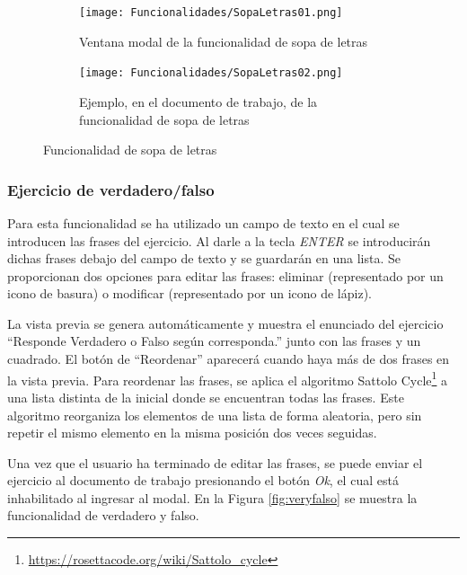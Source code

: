 \begin{figure}[ht!]
  \centering
  \begin{subfigure}{\textwidth}
    \centering
    \texttt{[image: Funcionalidades/SopaLetras01.png]}
    \caption{Ventana modal de la funcionalidad de sopa de letras}
    \label{fig:impsopaletras01}
  \end{subfigure}

  \begin{subfigure}{\textwidth}
    \centering
    \texttt{[image: Funcionalidades/SopaLetras02.png]}
    \caption{Ejemplo, en el documento de trabajo, de la funcionalidad de sopa de letras}
    \label{fig:impsopaletras02}
  \end{subfigure}

  \caption{Funcionalidad de sopa de letras}
  \label{fig:impsopaletras}
\end{figure}

\subsubsection{Ejercicio de verdadero/falso}
\label{sec:funcioVF}
Para esta funcionalidad se ha utilizado un campo de texto en el cual se introducen las frases del ejercicio. Al darle a la tecla \textit{ENTER} se introducirán dichas frases debajo del campo de texto y se guardarán en una lista. Se proporcionan dos opciones para editar las frases: eliminar (representado por un icono de basura) o modificar (representado por un icono de lápiz).

La vista previa se genera automáticamente y muestra el enunciado del ejercicio ``Responde Verdadero o Falso según corresponda.'' junto con las frases y un cuadrado. El botón de ``Reordenar'' aparecerá cuando haya más de dos frases en la vista previa. Para reordenar las frases, se aplica el algoritmo Sattolo Cycle\footnote{\url{https://rosettacode.org/wiki/Sattolo_cycle}} a una lista distinta de la inicial donde se encuentran todas las frases. Este algoritmo reorganiza los elementos de una lista de forma aleatoria, pero sin repetir el mismo elemento en la misma posición dos veces seguidas.

Una vez que el usuario ha terminado de editar las frases, se puede enviar el ejercicio al documento de trabajo presionando el botón \textit{Ok}, el cual está inhabilitado al ingresar al modal. En la Figura \ref{fig:veryfalso} se muestra la funcionalidad de verdadero y falso.

